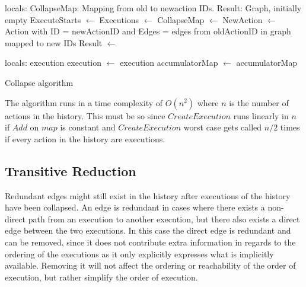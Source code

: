 	\begin{algorithm}[H]
		\begin{algorithmic}
			\State
				locals: CollapseMap: Mapping from old to newaction IDs.
				\State\hspace{28pt} Result: Graph, initially empty
				\State
				\State ExecuteStarts $\leftarrow$  \State
				Executions $\leftarrow$ 
				\State
					CollapseMap $\leftarrow$ 
				\EndFor
					\State
					NewAction $\leftarrow$ Action with \State\hspace{28pt}ID = newActionID and \State\hspace{28pt}Edges = edges from oldActionID in graph mapped to new IDs\State
					Result $\leftarrow$  \State{}
				\EndFor
				
			\EndFunction
			\State
				\State locals: execution
				 \State
					execution $\leftarrow$ 
				\EndWhile\State
				\Return execution
			\EndFunction
			\State
				\State
					accumulatorMap $\leftarrow$ 
				\EndFor \State
				\Return accumulatorMap
			\EndFunction
		\end{algorithmic}
		\caption{Collapse algorithm}
		\label{alg:collapse}
	\end{algorithm}
	
	\newpar The algorithm runs in a time complexity of $O(n^2)$ where $n$ is the number of actions in the history. This must be so since $CreateExecution$ runs linearly in $n$ if $Add$ on $map$ is constant and $CreateExecution$ worst case gets called $n/2$ times if every action in the history are executions. 
	
	\subsection{Transitive Reduction}
	
	\newpar Redundant edges might still exist in the history after executions of the history have been collapsed. An edge is redundant in cases where there exists a non-direct path from an execution to another execution, but there also exists a direct edge between the two executions. In this case the direct edge is redundant and can be removed, since it does not contribute extra information in regards to the ordering of the executions as it only explicitly expresses what is implicitly available. Removing it will not affect the ordering or reachability of the order of execution, but rather simplify the order of execution.
	
